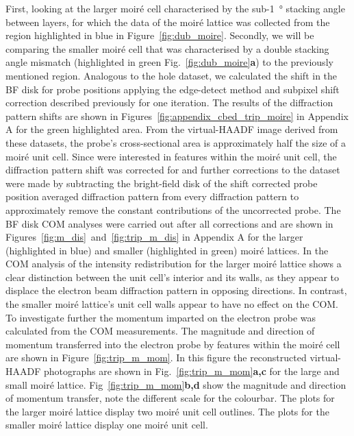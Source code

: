 First, looking at the larger moiré cell characterised by the sub-\SI{1}{\degree} stacking angle between layers, for which the
data of the moiré lattice was collected from the region highlighted in blue in Figure~\ref{fig:dub_moire}.
Secondly, we will be comparing the smaller moiré cell that was characterised by a double stacking angle mismatch (highlighted in green Fig.~\ref{fig:dub_moire}\textbf{a}) to the previously mentioned region.
%
Analogous to the hole dataset, we calculated the shift in the BF disk for probe positions applying the edge-detect method and subpixel shift correction described previously for one iteration.
%
The results of the diffraction pattern shifts are shown in Figures~\ref{fig:appendix_cbed_trip_moire} in Appendix A for the green highlighted area.
%
From the virtual-HAADF image derived from these datasets, the probe's cross-sectional area is approximately half the size of a moiré unit cell. 
%
Since were interested in features within the moiré unit cell, the diffraction pattern shift was corrected for and further corrections to the dataset were made by subtracting the bright-field disk of the shift corrected probe position averaged diffraction pattern from every diffraction pattern to approximately remove the constant contributions of the uncorrected probe.
%
The BF disk COM analyses were carried out after all corrections and are shown in Figures~\ref{fig:m_dis}~and~\ref{fig:trip_m_dis} in Appendix A for the larger (highlighted in blue) and smaller (highlighted in green) moiré lattices.
%
In the COM analysis of the intensity redistribution for the larger moiré lattice shows a clear distinction between the unit cell's interior and its walls, as they appear to displace the electron beam diffraction pattern in opposing directions.
%
In contrast, the smaller moiré lattice's unit cell walls appear to have no effect on the COM.
%
To investigate further the momentum imparted on the electron probe was calculated from the COM measurements.
%
The magnitude and direction of momentum transferred into the electron probe by features within the moiré cell are shown in Figure~\ref{fig:trip_m_mom}. In this figure the reconstructed virtual-HAADF photographs are shown in Fig.~\ref{fig:trip_m_mom}\textbf{a,c} for the large and small moiré lattice. Fig~\ref{fig:trip_m_mom}\textbf{b,d} show the magnitude and direction of momentum transfer, note the different scale for the colourbar. The plots for the larger moiré lattice display two moiré unit cell outlines. The plots for the smaller moiré lattice display one moiré unit cell.\\
